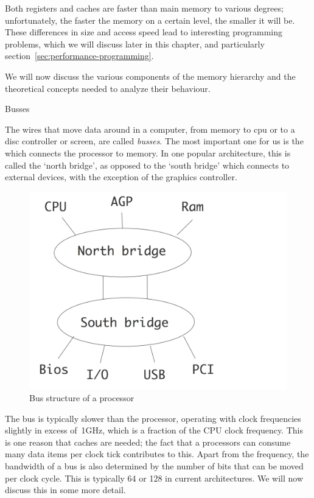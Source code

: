 Both registers and caches are faster
than main memory to various degrees; unfortunately, the faster the memory on a certain
level, the smaller it will be.
These differences in size and access speed lead to interesting programming
problems, which we will discuss later in this chapter, and
particularly section~\ref{sec:performance-programming}.

We will now discuss the various components of the memory hierarchy and
the theoretical concepts needed to analyze their behaviour.

 {Busses}

The wires that move data around in a computer, from memory to cpu or
to a disc controller or screen, are called \emph{busses}. The
most important one for us is the  which connects the processor to memory. In one popular
architecture, this is called the `north bridge', as opposed to the
`south bridge' which connects to external devices, with the exception
of the graphics controller.

\begin{figure}[ht]
\includegraphics[scale=.1]{graphics/bridges}
\caption{Bus structure of a processor}
\end{figure}

The bus is typically slower than the processor, operating with clock
frequencies slightly in excess of~1GHz, which is a fraction of the \ac{CPU}
clock frequency.  This is one reason that caches are needed; the fact
that a processors can consume many data items per clock tick
contributes to this. Apart from the frequency, the bandwidth of a bus is
also determined by the number of bits that can be moved per clock
cycle. This is typically 64 or 128 in current architectures. We will
now discuss this in some more detail.

